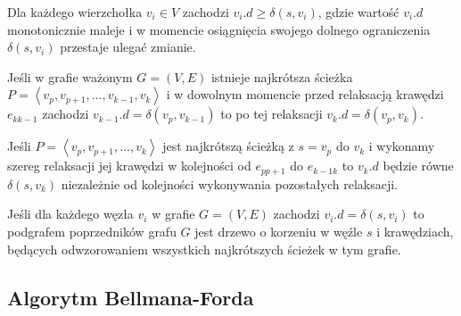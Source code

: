 \begin{lemma}
Dla każdego wierzchołka $v_{i} \in V$ zachodzi $ v_{i}.d \geqslant \delta \left( s , v_{i} \right)$, gdzie wartość $v_{i}.d$ monotonicznie maleje i w momencie osiągnięcia swojego dolnego ograniczenia $\delta \left( s , v_{i} \right)$ przestaje ulegać zmianie.
\end{lemma}\label{lem:costUpperBound}

\begin{lemma}
Jeśli w grafie ważonym $G = \left( V, E \right)$ istnieje najkrótsza ścieżka $P = \left \langle v_{p}, v_{p+1}, \ldots, v_{k-1}, v_{k} \right \rangle $ i w dowolnym momencie przed relaksacją krawędzi $e_{kk-1}$ zachodzi $ v_{k-1}.d = \delta \left( v_{p}, v_{k-1} \right)$ to po tej relaksacji $ v_{k}.d = \delta \left( v_{p}, v_{k} \right)$.
\end{lemma}\label{lem:convergenceProperty}

\begin{lemma}
Jeśli $P = \left \langle v_{p}, v_{p+1}, \ldots, v_{k} \right \rangle $ jest najkrótszą ścieżką z $s = v_{p}$ do $v_{k}$ i wykonamy szereg relaksacji jej krawędzi w kolejności od $e_{pp+1}$ do $e_{k-1k}$ to $v_{k}.d$ będzie równe $ \delta \left( s, v_{k}\right)$ niezależnie od kolejności wykonywania pozostałych relaksacji.
\end{lemma}\label{lem:pathRelaxation}

\begin{lemma}
Jeśli dla każdego węzła $v_{i}$ w grafie $G = \left( V, E \right)$ zachodzi $v_{i}.d = \delta \left( s, v_{i} \right)$ to podgrafem poprzedników grafu $G$ jest drzewo o korzeniu w węźle $s$ i krawędziach, będących odwzorowaniem wszystkich najkrótszych ścieżek w tym grafie.
\end{lemma}\label{lem:parentSubgraph}

\subsection{Algorytm Bellmana-Forda}

